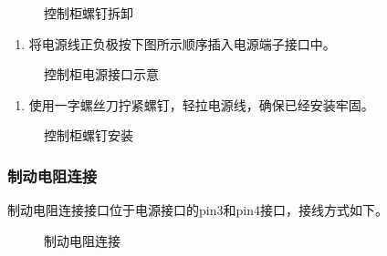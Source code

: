 \documentclass[a4paper,11pt,english,openany,oneside]{sphinxmanual}
\begin{document}
\begin{figure}[H]
\centering
\capstart

\noindent{}
\caption{控制柜螺钉拆卸}\label{\detokenize{08 _u5b89_u88c5_u4e0e_u8c03_u8bd5:id111}}\end{figure}


\begin{enumerate}
%
\setcounter{enumi}{1}
\item {} 
\sphinxAtStartPar
将电源线正负极按下图所示顺序插入电源端子接口中。

\end{enumerate}

\begin{figure}[H]
\centering
\capstart

\noindent{}
\caption{控制柜电源接口示意}\label{\detokenize{08 _u5b89_u88c5_u4e0e_u8c03_u8bd5:id112}}\end{figure}


\begin{enumerate}
%
\setcounter{enumi}{2}
\item {} 
\sphinxAtStartPar
使用一字螺丝刀拧紧螺钉，轻拉电源线，确保已经安装牢固。

\end{enumerate}

\begin{figure}[H]
\centering
\capstart

\noindent{}
\caption{控制柜螺钉安装}\label{\detokenize{08 _u5b89_u88c5_u4e0e_u8c03_u8bd5:id113}}\end{figure}




\subsubsection{制动电阻连接}
\label{\detokenize{08 _u5b89_u88c5_u4e0e_u8c03_u8bd5:id64}}\label{\detokenize{08 _u5b89_u88c5_u4e0e_u8c03_u8bd5:id65}}
\sphinxAtStartPar
制动电阻连接接口位于电源接口的pin3和pin4接口，接线方式如下。

\begin{figure}[H]
\centering
\capstart

\noindent{}
\caption{制动电阻连接}\label{\detokenize{08 _u5b89_u88c5_u4e0e_u8c03_u8bd5:id114}}\end{figure}
\end{document}

